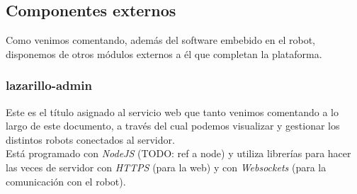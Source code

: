 \subsection{Componentes externos}

Como venimos comentando, además del software embebido en el robot, disponemos de otros módulos externos a él que completan la plataforma.

\subsubsection{lazarillo-admin}

Este es el título asignado al servicio web que tanto venimos comentando a lo largo de este documento, a través del cual podemos visualizar y gestionar los distintos robots conectados al servidor.\\

Está programado con \textit{NodeJS} (TODO: ref a node) y utiliza librerías para hacer las veces de servidor con \textit{HTTPS} (para la web) y con \textit{Websockets} (para la comunicación con el robot).\\
